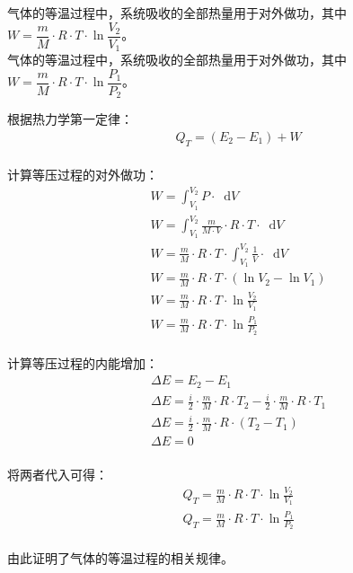 \documentclass[UTF8]{ctexart}
\newcommand*{\dif}{\mathop{}\!\mathrm{d}}
\begin{document}
    气体的等温过程中，系统吸收的全部热量用于对外做功，其中$W=\dfrac{m}{M}\cdot R\cdot T\cdot\ln{\dfrac{V_2}{V_1}}$。\\[4mm]
    气体的等温过程中，系统吸收的全部热量用于对外做功，其中$W=\dfrac{m}{M}\cdot R\cdot T\cdot\ln{\dfrac{P_1}{P_2}}$。

\newpage

    根据热力学第一定律：
    \begin{align}
        &Q_T=(E_2-E_1)+W
    \end{align}\\
    计算等压过程的对外做功：
    \begin{align}
        &W=\int_{V_1}^{V_2} P\cdot\dif V\\[3mm]
        &W=\int_{V_1}^{V_2} \frac{m}{M\cdot V}\cdot R\cdot T\cdot\dif V\\[3mm]
        &W=\frac{m}{M}\cdot R\cdot T\cdot\int_{V_1}^{V_2} \frac{1}{V}\cdot\dif V\\[3mm]
        &W=\frac{m}{M}\cdot R\cdot T\cdot\left(\ln{V_2}-\ln{V_1}\right)\\[3mm]
        &W=\frac{m}{M}\cdot R\cdot T\cdot\ln{\frac{V_2}{V_1}}\\[3mm]
        &W=\frac{m}{M}\cdot R\cdot T\cdot\ln{\frac{P_1}{P_2}}
    \end{align}\\
    计算等压过程的内能增加：
    \begin{align}
        &\Delta E=E_2-E_1\\[4mm]
        &\Delta E=\frac{i}{2}\cdot\frac{m}{M}\cdot R\cdot T_2-\frac{i}{2}\cdot\frac{m}{M}\cdot R\cdot T_1\\[4mm]
        &\Delta E=\frac{i}{2}\cdot\frac{m}{M}\cdot R\cdot (T_2-T_1)\\[4mm]
        &\Delta E=0
    \end{align}\\
    将两者代入可得：
    \begin{align}
        &Q_T=\frac{m}{M}\cdot R\cdot T\cdot\ln{\frac{V_2}{V_1}}\\[4mm]
        &Q_T=\frac{m}{M}\cdot R\cdot T\cdot\ln{\frac{P_1}{P_2}}
    \end{align}\\
    由此证明了气体的等温过程的相关规律。
\end{document}
